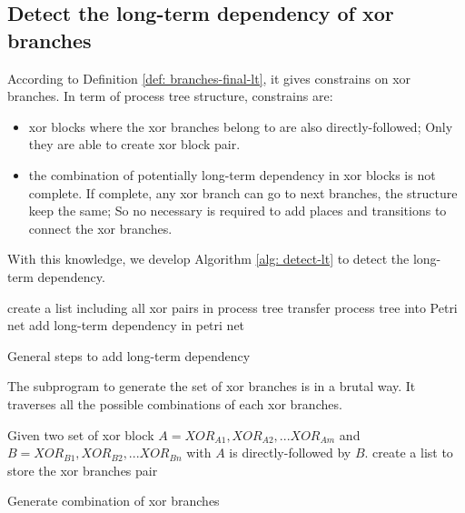 \documentclass[]{article}
\begin{document}
\subsection{Detect the long-term dependency of xor branches}
According to Definition \ref{def: branches-final-lt}, it gives constrains on xor branches. In term of process tree structure, constrains are:
\begin{itemize}
	\item xor blocks where the xor branches belong to are also directly-followed; Only they are able to create xor block pair. 
	\item the combination of potentially long-term dependency in xor blocks is not complete. If complete, any xor branch can go to next branches, the structure keep the same; So no necessary is required to add places and transitions to connect the xor branches. 
\end{itemize}
With this knowledge, we develop Algorithm \ref{alg: detect-lt} to detect the long-term dependency. 
\begin{algorithm}
	\SetAlgoLined
	\label{alg: detect-lt}
	create a list including all xor pairs in process tree\;
	transfer process tree into Petri net\;
	add long-term dependency in petri net\;
	\caption{General steps to add long-term dependency}
\end{algorithm}
The subprogram to generate the set of xor branches is in a brutal way. It traverses all the possible combinations of each xor branches.
\begin{algorithm}
	\SetAlgoLined
	\label{alg: generate-lt-combination}
	Given two set of xor block $A={XOR_{A1} ,XOR_{A2}, ...XOR_{Am}}$ and $B={XOR_{B1} ,XOR_{B2}, ...XOR_{Bn}}$ with $A$ is directly-followed by $B$.\;
	create a list to store the xor branches pair\;
	\caption{Generate combination of xor branches}
\end{algorithm}
\end{document}
